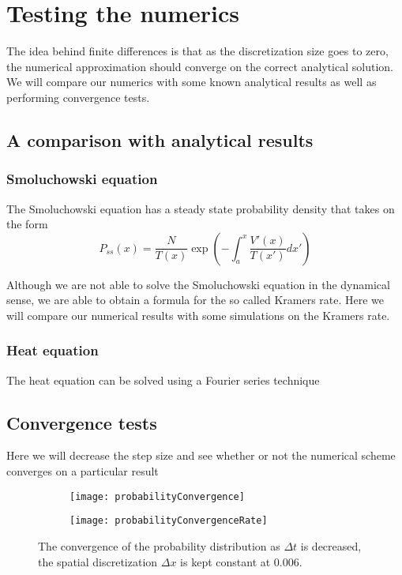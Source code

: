 \chapter{Testing the numerics}

The idea behind finite differences is that as the discretization size goes to zero, the numerical approximation should converge on the correct analytical solution. We will compare our numerics with some known analytical results as well as performing convergence tests.
\section{A comparison with analytical results}
\subsection{Smoluchowski equation}
The Smoluchowski equation has a steady state probability density that takes on the form \cite{DasDasBarikEtAl2015}
\begin{equation}
P_{ss}(x) = \frac{N}{T(x)} \exp{\left(-\int_a^x \frac{V'(x)}{T(x')} dx' \right)}
\end{equation}

Although we are not able to solve the Smoluchowski equation in the dynamical sense, we are able to obtain a formula for the so called Kramers rate. Here we will compare our numerical results with some simulations on the Kramers rate.

\subsection{Heat equation}
The heat equation can be solved using a Fourier series technique

\section{Convergence tests}
Here we will decrease the step size and see whether or not the numerical scheme converges on a particular result

\begin{figure}
	\begin{subfigure}{0.49\textwidth}
		\texttt{[image: probabilityConvergence]}
	\end{subfigure}
	\begin{subfigure}{0.49\textwidth}
		\texttt{[image: probabilityConvergenceRate]}
	\end{subfigure}
\caption{The convergence of the probability distribution as $\Delta t$ is decreased, the spatial discretization $\Delta x$ is kept constant at 0.006.}
\label{fig:Schematic}
\end{figure}